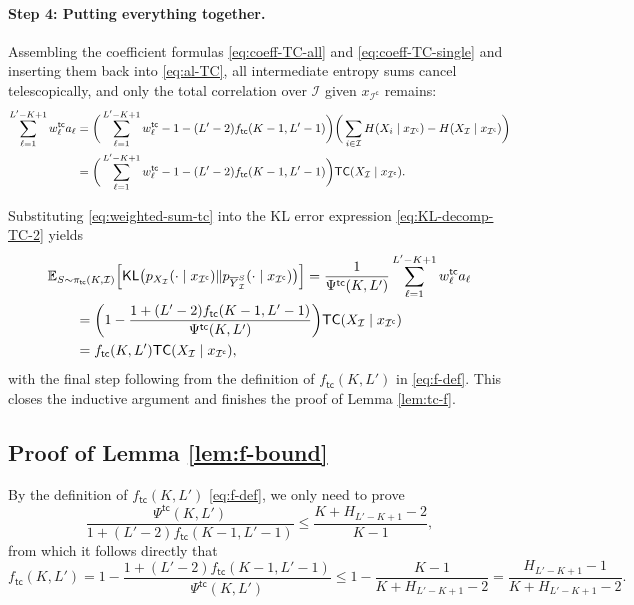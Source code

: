 \documentclass[english]{article}
\newcommand{\cI}{\mathcal{I}}
\newcommand{\bE}{\mathbb{E}}
\newcommand{\KL}{\mathsf{KL}}
\newcommand{\ol}{\overline}
\newcommand{\TC}{\mathsf{TC}}
\newcommand{\tc}{\mathsf{tc}}
\begin{document}
\paragraph{Step 4: Putting everything together.}
Assembling the coefficient formulas \eqref{eq:coeff-TC-all} and \eqref{eq:coeff-TC-single} and inserting them back into \eqref{eq:al-TC}, all intermediate entropy sums cancel telescopically, and only the total correlation over $ \cI $ given $ x_{\cI^\mathsf{c}} $ remains:
\begin{align}
\sum_{\ell = 1}^{L'-K+1} w^\tc_{\ell} a_\ell
& = \bigg(\sum_{\ell = 1}^{L'-K+1} w^\tc_{\ell} - 1 - (L'-2)f_\tc(K-1, L'-1)\bigg) \bigg(\sum_{i \in \cI} H(X_i \mid x_{\cI^\mathsf{c}}) - H(X_{\cI} \mid x_{\cI^\mathsf{c}})\bigg) \notag\\
& = \bigg(\sum_{\ell = 1}^{L'-K+1} w^\tc_{\ell} - 1 - (L'-2)f_\tc(K-1, L'-1)\bigg) \TC(X_{\cI} \mid x_{\cI^\mathsf{c}}). \label{eq:weighted-sum-tc}
\end{align}




Substituting \eqref{eq:weighted-sum-tc} into the KL error expression \eqref{eq:KL-decomp-TC-2} yields
\begin{align}
    &\bE_{S \sim \pi_{\tc}(K, \cI)} \Big[\KL\big(p_{X_{\cI}}(\cdot \mid x_{\cI^\mathsf{c}}) \| p_{\ol Y_{\cI}^S}(\cdot \mid x_{\cI^\mathsf{c}}) \big)\Big] = \frac{1}{\Psi^{\tc}(K,L')}\sum_{\ell = 1}^{L'-K+1} w^\tc_{\ell} a_\ell \notag\\
     &\qquad = \bigg(1-\frac{1 + (L'-2)f_\tc(K-1, L'-1)}{\Psi^{\tc}(K, L')}\bigg) \TC(X_{\cI} \mid x_{\cI^\mathsf{c}}) \notag\\
     &\qquad = f_\tc(K, L') \TC(X_{\cI} \mid x_{\cI^\mathsf{c}}), \label{eq:KL-bound-final-TC}
\end{align}
with the final step following from the definition of $ f_\tc(K, L') $ in \eqref{eq:f-def}.
This closes the inductive argument and finishes the proof of Lemma \ref{lem:tc-f}.


\subsection{Proof of Lemma \ref{lem:f-bound}}
\label{sec:proof-f-bound}
By the definition of $ f_\tc(K, L') $ \eqref{eq:f-def}, we only need to prove 
\begin{equation}
    \frac{\Psi^{\tc}(K, L')}{1 + (L'-2)f_\tc(K-1, L'-1)} \leq \frac{K + H_{L'-K+1} - 2}{K - 1}, \label{eq:tc-error-bound-Psi}
\end{equation}
from which it follows directly that
\[
    f_\tc(K, L') = 1 - \frac{1 + (L'-2)f_\tc(K-1, L'-1)}{\Psi^{\tc}(K, L')} \leq 1 - \frac{K-1}{K + H_{L'-K+1} - 2} = \frac{H_{L'-K+1} - 1}{K + H_{L'-K+1} - 2}.
\]
\end{document}
